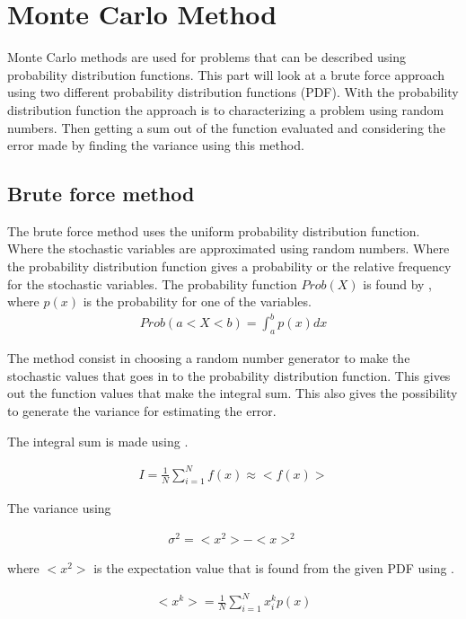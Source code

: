 \section{Monte Carlo Method}


Monte Carlo methods are used for problems that can be described using probability distribution functions. This part will look at a brute force approach using two different probability distribution functions (PDF). With the probability distribution function the approach is to characterizing a problem using random numbers. Then getting a sum out of the function evaluated and considering the error made by finding the variance using this method.  

\subsection{Brute force method}
\label{subsec:MCMethod}
The brute force method uses the uniform probability distribution function. Where the stochastic variables are approximated using random numbers. Where the probability distribution function gives a probability or the relative frequency for the stochastic variables. The probability function $Prob(X)$ is found by , where $p(x)$ is the probability for one of the variables.
\begin{align}
Prob(a < X <b) = \int_a^b p(x) dx
\label{eq:probfunc}
\end{align}

The method consist in choosing a random number generator to make the stochastic values that goes in to the probability distribution function. This gives out the function values that make the integral sum. This also gives the possibility to generate the variance for estimating the error. 

The integral sum is made using . 

\begin{align}
I = \frac{1}{N}\sum_{i=1}^{N} f(x) \approx <f(x)>
\label{eq:integralBF}
\end{align}
 
The variance using 

\begin{align}
\sigma^2 = <x^2> - <x>^2
\label{eq:varianceBF} 
\end{align}

where $<x^2>$ is the expectation value that is found from the given PDF using . 

\begin{align}
<x^k> = \frac{1}{N}\sum_{i=1}^N x_i^k p(x)
\label{eq:expvalue}
\end{align} 

